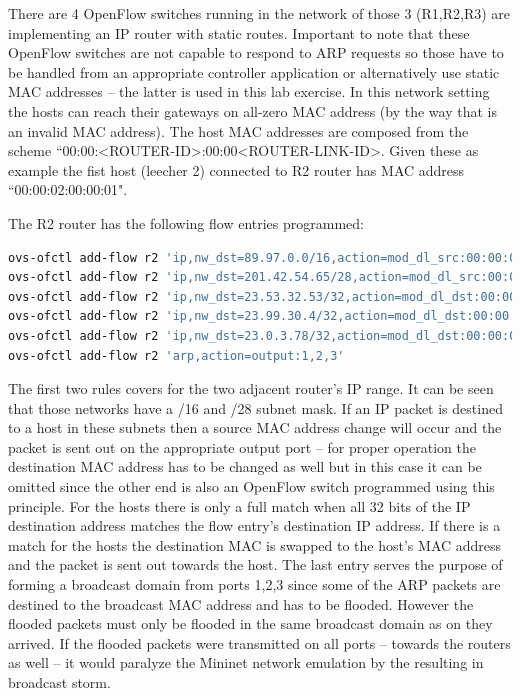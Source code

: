 \documentclass[a4paper]{article}
\begin{document}
There are 4 OpenFlow switches running in the network of those 3 (R1,R2,R3) are implementing an IP router with static
routes. Important to note that these OpenFlow switches are not capable to respond to ARP requests so those have to be
handled from an appropriate controller application or alternatively use static MAC addresses -- the latter is used in
this lab exercise. In this network setting the hosts can reach their gateways on all-zero MAC address (by the way that
is an invalid MAC address). The host MAC addresses are composed from the scheme
``00:00:<ROUTER-ID>:00:00<ROUTER-LINK-ID>. Given these as example the fist host (leecher 2) connected to R2 router has
MAC address ``00:00:02:00:00:01".

The R2 router has the following flow entries programmed:

\begin{lstlisting}[language=bash,frame=single,breaklines,caption={R2 router flow entry configuration},label=lst:R2-flow-config]
ovs-ofctl add-flow r2 'ip,nw_dst=89.97.0.0/16,action=mod_dl_src:00:00:00:00:00:00,output:4'
ovs-ofctl add-flow r2 'ip,nw_dst=201.42.54.65/28,action=mod_dl_src:00:00:00:00:00:00,output:5'
ovs-ofctl add-flow r2 'ip,nw_dst=23.53.32.53/32,action=mod_dl_dst:00:00:02:00:00:01,output:1'
ovs-ofctl add-flow r2 'ip,nw_dst=23.99.30.4/32,action=mod_dl_dst:00:00:02:00:00:02,output:2'
ovs-ofctl add-flow r2 'ip,nw_dst=23.0.3.78/32,action=mod_dl_dst:00:00:02:00:00:03,output:3'
ovs-ofctl add-flow r2 'arp,action=output:1,2,3' 
\end{lstlisting}

The first two rules covers for the two adjacent router's IP range. It can be seen that those networks have a /16 and
/28 subnet mask. If an IP packet is destined to a host in these subnets then a source MAC address change will occur and
the packet is sent out on the appropriate output port -- for proper operation the destination MAC address has to be
changed as well but in this case it can be omitted since the other end is also an OpenFlow switch programmed using this
principle.
For the hosts there is only a full match when all 32 bits of the IP destination address matches the flow entry's
destination IP address. If there is a match for the hosts the destination MAC is swapped to the host's MAC address and
the packet is sent out towards the host. The last entry serves the purpose of forming a broadcast domain from ports
1,2,3 since some of the ARP packets are destined to the broadcast MAC address and has to be flooded. However the
flooded packets must only be flooded in the same broadcast domain as on they arrived. If the flooded packets were
transmitted on all ports  -- towards the routers as well -- it would paralyze the Mininet network emulation by the
resulting in broadcast storm.
\end{document}
